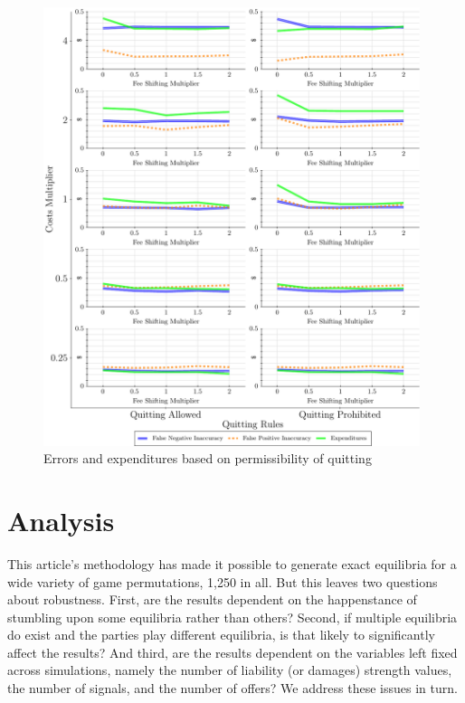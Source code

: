\documentclass{article}
\begin{document}
\begin{figure}
\begin{minipage}{0.48\textwidth}
        \includegraphics[width=0.98\textwidth, scale=0.70, trim={0in 0in 0in 0in}, clip]{../Figures/Accuracy and Expenditures Varying Quitting Rules} %
        \caption{Errors and expenditures based on permissibility of quitting}
		\label{fig:accexp_quit}
    \end{minipage}
\end{figure}

\section{Analysis} \label{Robustness analysis}

This article's methodology has made it possible to generate exact equilibria for a wide variety of game permutations, 1,250 in all. But this leaves two questions about robustness. First, are the results dependent on the happenstance of stumbling upon some equilibria rather than others? Second, if multiple equilibria do exist and the parties play different equilibria, is that likely to significantly affect the results? And third, are the results dependent on the variables left fixed across simulations, namely the number of liability (or damages) strength values, the number of signals, and the number of offers? We address these issues in turn.
\end{document}
